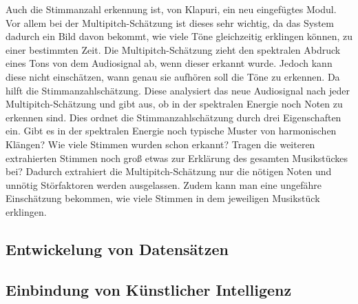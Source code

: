 Auch die Stimmanzahl erkennung ist, von Klapuri, ein neu eingefügtes Modul.
Vor allem bei der Multipitch-Schätzung ist dieses sehr wichtig, da das System dadurch ein Bild davon bekommt,
wie viele Töne gleichzeitig erklingen können, zu einer bestimmten Zeit.
Die Multipitch-Schätzung zieht den spektralen Abdruck eines Tons von dem Audiosignal ab, wenn dieser erkannt wurde.
Jedoch kann diese nicht einschätzen, wann genau sie aufhören soll die Töne zu erkennen.
Da hilft die Stimmanzahlschätzung.
Diese analysiert das neue Audiosignal nach jeder Multipitch-Schätzung und gibt aus,
ob in der spektralen Energie noch Noten zu erkennen sind.
Dies ordnet die Stimmanzahlschätzung durch drei Eigenschaften ein.
Gibt es in der spektralen Energie noch typische Muster von harmonischen Klängen?
Wie viele Stimmen wurden schon erkannt?
Tragen die weiteren extrahierten Stimmen noch groß etwas zur Erklärung des gesamten Musikstückes bei?
Dadurch extrahiert die Multipitch-Schätzung nur die nötigen Noten und unnötig Störfaktoren werden ausgelassen.
Zudem kann man eine ungefähre Einschätzung bekommen, wie viele Stimmen in dem jeweiligen Musikstück erklingen.


\subsection{Entwickelung von Datensätzen}


\subsection{Einbindung von Künstlicher Intelligenz}
